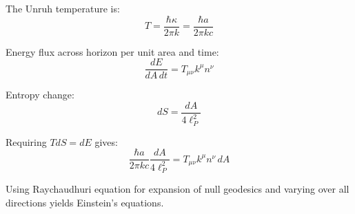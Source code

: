 \documentclass[11pt,a4paper]{article}
\theoremstyle{plain}
\theoremstyle{definition}
\theoremstyle{remark}
\begin{document}
The Unruh temperature is:
\begin{equation}
T = \frac{\hbar\kappa}{2\pi k} = \frac{\hbar a}{2\pi kc}
\end{equation}

Energy flux across horizon per unit area and time:
\begin{equation}
\frac{dE}{dA\,dt} = T_{\mu\nu}k^\mu n^\nu
\end{equation}

Entropy change:
\begin{equation}
dS = \frac{dA}{4\ell_P^2}
\end{equation}

Requiring $TdS = dE$ gives:
\begin{equation}
\frac{\hbar a}{2\pi kc}\frac{dA}{4\ell_P^2} = T_{\mu\nu}k^\mu n^\nu\,dA
\end{equation}

Using Raychaudhuri equation for expansion of null geodesics and varying over all directions yields Einstein's equations.
\end{document}
